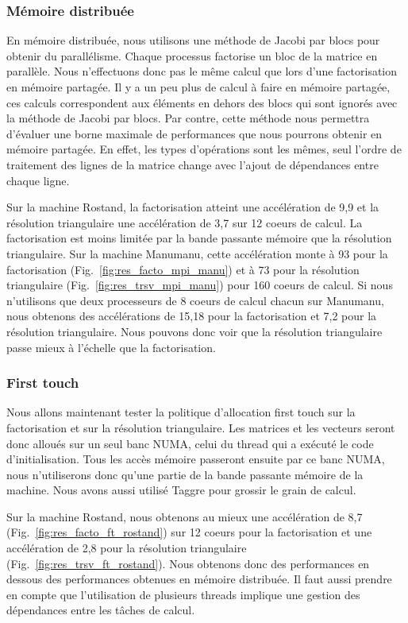 \subsubsection{Mémoire distribuée}
En mémoire distribuée, nous utilisons une méthode de Jacobi par blocs pour obtenir du parallélisme.
%
Chaque processus factorise un bloc de la matrice en parallèle.
%
Nous n'effectuons donc pas le même calcul que lors d'une factorisation en mémoire partagée.
%
Il y a un peu plus de calcul à faire en mémoire partagée, ces calculs correspondent aux éléments en dehors des blocs qui sont ignorés avec la méthode de Jacobi par blocs.
%
Par contre, cette méthode nous permettra d'évaluer une borne maximale de performances que nous pourrons obtenir en mémoire partagée.
%
En effet, les types d'opérations sont les mêmes, seul l'ordre de traitement des lignes de la matrice change avec l'ajout de dépendances entre chaque ligne.


Sur la machine Rostand, la factorisation atteint une accélération de 9,9 et la résolution triangulaire une accélération de 3,7 sur 12 coeurs de calcul.
%
La factorisation est moins limitée par la bande passante mémoire que la résolution triangulaire.
%
Sur la machine Manumanu, cette accélération monte à 93 pour la factorisation (Fig.~\ref{fig:res_facto_mpi_manu}) et à 73 pour la résolution triangulaire (Fig.~\ref{fig:res_trsv_mpi_manu}) pour 160 coeurs de calcul.
%
Si nous n'utilisons que deux processeurs de 8 coeurs de calcul chacun sur Manumanu, nous obtenons des accélérations de 15,18 pour la factorisation et 7,2 pour la résolution triangulaire.
%
Nous pouvons donc voir que la résolution triangulaire passe mieux à l'échelle que la factorisation.


\subsubsection{First touch}
Nous allons maintenant tester la politique d'allocation first touch sur la factorisation et sur la résolution triangulaire.
%
Les matrices et les vecteurs seront donc alloués sur un seul banc NUMA, celui du thread qui a exécuté le code d'initialisation.
%
Tous les accès mémoire passeront ensuite par ce banc NUMA, nous n'utiliserons donc qu'une partie de la bande passante mémoire de la machine.
%
Nous avons aussi utilisé Taggre pour grossir le grain de calcul.


Sur la machine Rostand, nous obtenons au mieux une accélération de 8,7 (Fig.~\ref{fig:res_facto_ft_rostand}) sur 12 coeurs pour la factorisation et une accélération de 2,8 pour la résolution triangulaire (Fig.~\ref{fig:res_trsv_ft_rostand}).
%
Nous obtenons donc des performances en dessous des performances obtenues en mémoire distribuée.
%
Il faut aussi prendre en compte que l'utilisation de plusieurs threads implique une gestion des dépendances entre les tâches de calcul.


